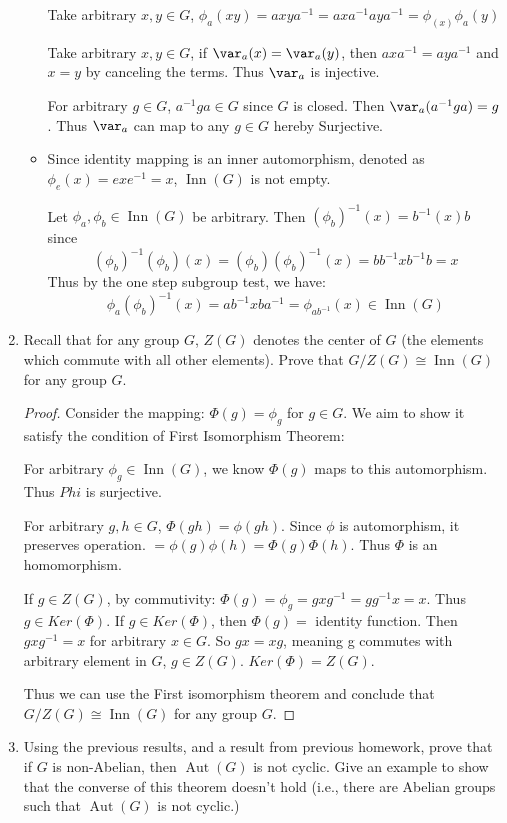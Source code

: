 \documentclass[11pt, oneside]{article}
\newcommand{\Aut}{\operatorname{Aut}}
\newcommand{\Inn}{\operatorname{Inn}}
\begin{document}
\begin{enumerate}
\begin{itemize}
    Take arbitrary $x, y\in G$, $\phi_a(xy)=axya^{-1}=axa^{-1}aya^{-1}=\phi_(x)\phi_a(y)$
    
    Take arbitrary $x, y \in G$, if $\var_a(x)=\var_a(y)$, then $axa^{-1}=aya^{-1}$ and $x=y$ by canceling the terms. Thus $\var_a$ is injective.
    
    For arbitrary $g\in G$, $a^{-1}ga\in G$ since $G$ is closed. Then $\var_a(a^{-1}ga)=g$. Thus $\var_a$ can map to any $g\in G$ hereby Surjective. 
    \item[proof for part 2:]
    Since identity mapping is an inner automorphism, denoted as $\phi_e(x)=exe^{-1}=x$, $\Inn(G)$ is not empty. 
    
    Let $\phi_a, \phi_b\in \Inn(G)$ be arbitrary. Then $(\phi_b)^{-1}(x)=b^{-1}(x)b$ since \[(\phi_b)^{-1}(\phi_b)(x)=(\phi_b)(\phi_b)^{-1}(x)=bb^{-1}xb^{-1}b=x\]
    Thus by the one step subgroup test, we have: \[\phi_a(\phi_b)^{-1}(x)=ab^{-1}xba^{-1}=\phi_{ab^{-1}}(x)\in \Inn(G)\]
    
\end{itemize}
\newpage
\item[{\bf Problem 7:}] Recall that for any group $G$, $Z(G)$ denotes the center of $G$ (the elements which commute with all other elements). Prove that $G/Z(G)\cong \Inn(G)$ for any group $G$.
\begin{proof}
Consider the mapping: $\Phi(g)=\phi_g $ for $g\in G$. We aim to show it satisfy the condition of First Isomorphism Theorem:

For arbitrary $\phi_g \in \Inn (G)$, we know $\Phi(g)$ maps to this automorphism. Thus $Phi$ is surjective.

For arbitrary $g, h\in G$, $\Phi(gh)=\phi(gh)$. Since $\phi$ is automorphism, it preserves operation. $=\phi(g)\phi(h)=\Phi(g)\Phi(h)$. Thus $\Phi$ is an homomorphism. 

If $g\in Z(G)$, by commutivity: $\Phi(g)=\phi_g=gxg^{-1}=gg^{-1}x=x$. Thus $g\in Ker(\Phi)$. If $g\in  Ker(\Phi)$, then $\Phi(g)=$ identity function. Then $gxg^{-1}=x$ for arbitrary $x\in G$. So $gx=xg$, meaning g commutes with arbitrary element in $G$, $g\in Z(G)$. $Ker(\Phi)=Z(G)$.

Thus we can use the First isomorphism theorem and conclude that $G/Z(G)\cong \Inn(G)$ for any group $G$.

\end{proof}
\newpage
\item[{\bf Problem 8:}] Using the previous results, and a result from previous homework, prove that if $G$ is non-Abelian, then $\Aut(G)$ is not cyclic. Give an example to show that the converse of this theorem doesn't hold (i.e., there are Abelian groups such that $\Aut(G)$ is not cyclic.)


\end{enumerate}
\end{document}
